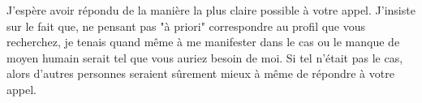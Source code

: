 \documentclass[11pt,a4paper,sans]{moderncv}        %
\begin{document}
J'espère avoir répondu de la manière la plus claire possible à votre appel. J'insiste sur le fait que, ne pensant pas "à priori" correspondre au profil que vous recherchez, je tenais quand même à me manifester dans le cas ou le manque de moyen humain serait tel que vous auriez besoin de moi. Si tel n'était pas le cas, alors d'autres personnes seraient sûrement mieux à même de répondre à votre appel.

\makeletterclosing
\end{document}
